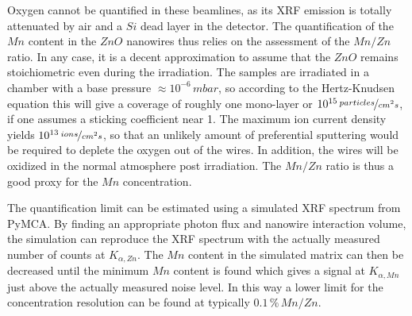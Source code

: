 Oxygen cannot be quantified in these beamlines, as its XRF emission is totally attenuated by air and a $Si$ dead layer in the detector. The quantification of the $Mn$ content in the $ZnO$ nanowires thus relies on the assessment of the $Mn/Zn$ ratio. In any case, it is a decent approximation to assume that the $ZnO$ remains stoichiometric even during the irradiation. The samples are irradiated in a chamber with a base pressure $\approx 10^{-6}\,mbar$, so according to the Hertz-Knudsen equation  this will give a coverage of roughly one mono-layer or $10^{15}\,\nicefrac{particles}{cm^2s}$, if one assumes a sticking coefficient near 1. The maximum ion current density yields $10^{13}\,\nicefrac{ions}{cm^2s}$, so that an unlikely amount of preferential sputtering would be required to deplete the oxygen out of the wires. In addition, the wires will be oxidized in the normal atmosphere post irradiation. The $Mn/Zn$ ratio is thus a good proxy for the $Mn$ concentration.

The quantification limit can be estimated using a simulated XRF spectrum from PyMCA. By finding an appropriate photon flux and nanowire interaction volume, the simulation can reproduce the XRF spectrum with the actually measured number of counts at $K_{\alpha,Zn}$. The $Mn$ content in the simulated matrix can then be decreased until the minimum $Mn$ content is found which gives a signal at $K_{\alpha,Mn}$ just above the actually measured noise level. In this way a lower limit for the concentration resolution can be found at typically $0.1\,\%\,Mn/Zn$.



